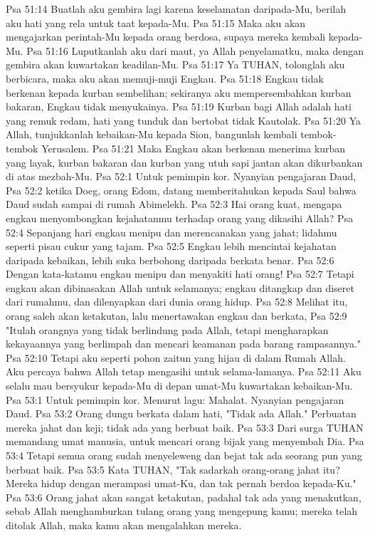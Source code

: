 Psa 51:14  Buatlah aku gembira lagi karena keselamatan daripada-Mu, berilah aku hati yang rela untuk taat kepada-Mu.
Psa 51:15  Maka aku akan mengajarkan perintah-Mu kepada orang berdosa, supaya mereka kembali kepada-Mu.
Psa 51:16  Luputkanlah aku dari maut, ya Allah penyelamatku, maka dengan gembira akan kuwartakan keadilan-Mu.
Psa 51:17  Ya TUHAN, tolonglah aku berbicara, maka aku akan memuji-muji Engkau.
Psa 51:18  Engkau tidak berkenan kepada kurban sembelihan; sekiranya aku mempersembahkan kurban bakaran, Engkau tidak menyukainya.
Psa 51:19  Kurban bagi Allah adalah hati yang remuk redam, hati yang tunduk dan bertobat tidak Kautolak.
Psa 51:20  Ya Allah, tunjukkanlah kebaikan-Mu kepada Sion, bangunlah kembali tembok-tembok Yerusalem.
Psa 51:21  Maka Engkau akan berkenan menerima kurban yang layak, kurban bakaran dan kurban yang utuh sapi jantan akan dikurbankan di atas mezbah-Mu.
Psa 52:1  Untuk pemimpin kor. Nyanyian pengajaran Daud,
Psa 52:2  ketika Doeg, orang Edom, datang memberitahukan kepada Saul bahwa Daud sudah sampai di rumah Abimelekh.
Psa 52:3  Hai orang kuat, mengapa engkau menyombongkan kejahatanmu terhadap orang yang dikasihi Allah?
Psa 52:4  Sepanjang hari engkau menipu dan merencanakan yang jahat; lidahmu seperti pisau cukur yang tajam.
Psa 52:5  Engkau lebih mencintai kejahatan daripada kebaikan, lebih suka berbohong daripada berkata benar.
Psa 52:6  Dengan kata-katamu engkau menipu dan menyakiti hati orang!
Psa 52:7  Tetapi engkau akan dibinasakan Allah untuk selamanya; engkau ditangkap dan diseret dari rumahmu, dan dilenyapkan dari dunia orang hidup.
Psa 52:8  Melihat itu, orang saleh akan ketakutan, lalu menertawakan engkau dan berkata,
Psa 52:9  "Itulah orangnya yang tidak berlindung pada Allah, tetapi mengharapkan kekayaannya yang berlimpah dan mencari keamanan pada barang rampasannya."
Psa 52:10  Tetapi aku seperti pohon zaitun yang hijau di dalam Rumah Allah. Aku percaya bahwa Allah tetap mengasihi untuk selama-lamanya.
Psa 52:11  Aku selalu mau bersyukur kepada-Mu di depan umat-Mu kuwartakan kebaikan-Mu.
Psa 53:1  Untuk pemimpin kor. Menurut lagu: Mahalat. Nyanyian pengajaran Daud.
Psa 53:2  Orang dungu berkata dalam hati, "Tidak ada Allah." Perbuatan mereka jahat dan keji; tidak ada yang berbuat baik.
Psa 53:3  Dari surga TUHAN memandang umat manusia, untuk mencari orang bijak yang menyembah Dia.
Psa 53:4  Tetapi semua orang sudah menyeleweng dan bejat tak ada seorang pun yang berbuat baik.
Psa 53:5  Kata TUHAN, "Tak sadarkah orang-orang jahat itu? Mereka hidup dengan merampasi umat-Ku, dan tak pernah berdoa kepada-Ku."
Psa 53:6  Orang jahat akan sangat ketakutan, padahal tak ada yang menakutkan, sebab Allah menghamburkan tulang orang yang mengepung kamu; mereka telah ditolak Allah, maka kamu akan mengalahkan mereka.
